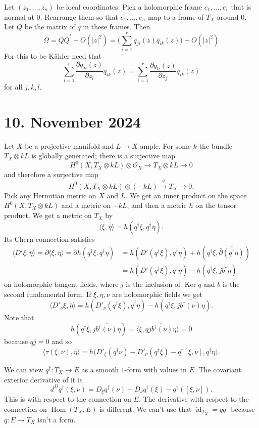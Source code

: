 \documentclass[11pt]{amsart}
\theoremstyle{definition}
\newcommand{\cc}[1]{\mathcal{#1}}
\def\ov#1{\overline{#1}}
\def\lra{\longrightarrow}
\DeclareMathOperator{\Ker}{Ker}
\DeclareMathOperator{\Hom}{Hom}
\DeclareMathOperator{\id}{id}
\def\<{\langle}
\def\>{\rangle}
\begin{document}
Let $(z_1,\ldots,z_n)$ be local coordinates.
Pick a holomorphic frame $e_1, \ldots, e_r$ that is normal at $0$.
Rearrange them so that $e_1,\ldots,e_n$ map to a frame of $T_X$ around $0$.
Let $Q$ be the matrix of $q$ in these frames.
Then 
\[
\Omega = Q \ov Q^t + O(|z|^2)
= \biggl(
\sum_{i=1}^r q_{ji}(z) \bar q_{ik}(z)
\biggr) + O(|z|^2)
\]
For this to be K\"ahler need that
\[
\sum_{i=1}^r \frac{\partial q_{ji}(z)}{\partial z_l} \bar q_{ik}(z)
= \sum_{i=1}^r \frac{\partial q_{li}(z)}{\partial z_j} \bar q_{ik}(z)
\]
for all $j,k,l$.




\section{10. November 2024}

Let $X$ be a projective manifold and $L \to X$ ample.
For some $k$ the bundle $T_X \otimes kL$ is globally generated; there is a surjective map
\[
H^0(X, T_X \otimes kL) \otimes \cc O_X \lra T_X \otimes kL \lra 0
\]
and therefore a surjective map
\[
H^0(X, T_X \otimes kL) \otimes (-kL) \stackrel{q}{\lra} T_X \lra 0.
\]
Pick any Hermitian metric on $X$ and $L$.
We get an inner product on the space $H^0(X, T_X \otimes kL)$ and a metric on $-kL$, and then a metric $h$ on the tensor product.
We get a metric on $T_X$ by
\[
\< \xi, \bar\eta \>
= h(q^\dagger \xi, \ov{q^\dagger \eta}).
\]
Its Chern connection satisfies
\begin{align*}
\< D'\xi, \bar\eta \>
= \partial\< \xi, \bar\eta \>
= \partial h(q^\dagger \xi, \ov{q^\dagger \eta})
&= h(D'(q^\dagger \xi), \ov{q^\dagger \eta})
+ h(q^\dagger \xi, \ov{\bar\partial (q^\dagger \eta)})
\\
&= h(D'(q^\dagger \xi), \ov{q^\dagger \eta})
- h(q^\dagger \xi, \ov{j b^\dagger \eta})
\end{align*}
on holomorphic tangent fields, where $j$ is the inclusion of $\Ker q$ and $b$ is the second fundamental form.
If $\xi,\eta,\nu$ are holomorphic fields we get
\[
\< D'_{\nu}\xi, \bar\eta \>
= h(D'_{\nu}(q^\dagger \xi), \ov{q^\dagger \eta})
- h(q^\dagger \xi, \ov{j b^\dagger(\nu) \eta}).
\]
Note that
\[
h(q^\dagger \xi, \ov{j b^\dagger(\nu) \eta})
= \< \xi, \ov{ q j b^\dagger(\nu) \eta} \>
= 0
\]
because $qj = 0$ and so
\[
\< \tau(\xi, \nu), \bar\eta \>
= h\bigl(D'_{\xi}(q^\dagger \nu) - D'_{\nu}(q^\dagger \xi) - q^\dagger [\xi, \nu], \ov{q^\dagger \eta}\bigr).
\]

We can view $q^\dagger : T_X \to E$ as a smooth $1$-form with values in $E$.
The covariant exterior derivative of it is
\[
d^D q^\dagger(\xi, \nu)
= D_\xi q^\dagger(\nu) - D_\nu q^\dagger(\xi) - q^\dagger([\xi,\nu]).
\]
This is with respect to the connection on $E$.
The derivative with respect to the connection on $\Hom(T_X,E)$ is different.
We can't use that $\id_{T_X} = q q^\dagger$ because $q : E \to T_X$ isn't a form.
\end{document}
